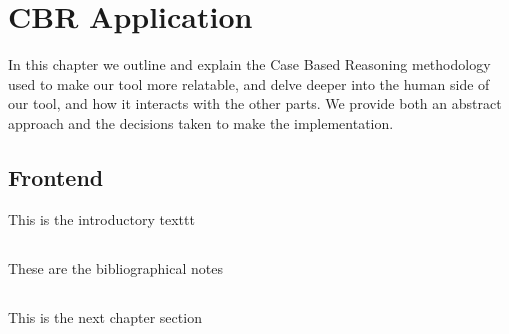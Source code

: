 %
%

\chapter{CBR Application}

\begin{resumen}
In this chapter we outline and explain the Case Based Reasoning methodology used to make our tool more relatable, and delve deeper into the human side of our tool, and how it interacts with the other parts.
We provide both an abstract approach and the decisions taken to make the implementation.
\end{resumen}


\section{Frontend}
\label{cap1:sec:introduccion}

This is the introductory texttt

\section*{\NotasBibliograficas}
\TocNotasBibliograficas

These are the bibliographical notes
\citep{ldesc2e}

\medskip



\section*{\ProximoCapitulo}
\TocProximoCapitulo

This is the next chapter section

